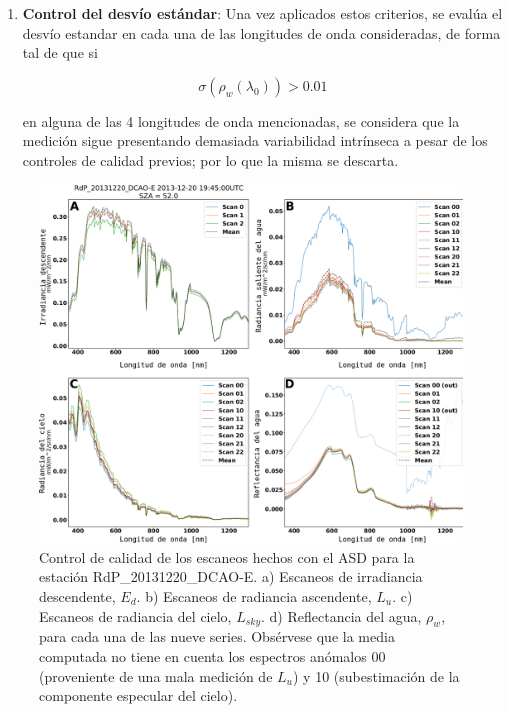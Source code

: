 \begin{enumerate}
                \item \textbf{Control del desvío estándar}: Una vez aplicados estos criterios, se evalúa el desvío estandar en cada una de las longitudes de onda consideradas, de forma tal de que si
                
                \begin{equation}
                    \sigma(\rho_{w}(\lambda_{0})) > 0.01
                    \label{dat:eq:}
                \end{equation}
                
                \noindent
                en alguna de las 4 longitudes de onda mencionadas, se considera que la medición sigue presentando demasiada variabilidad intrínseca a pesar de los controles de calidad previos; por lo que la misma se descarta.

            \end{enumerate}

            \begin{figure}
            \centering
            \includegraphics[width=\textwidth]{dat/figures/ASD_QC.png}
            \caption[Control de calidad de los escaneos hechos con el ASD para la estación RdP\_20131220\_DCAO-E.]{Control de calidad de los escaneos hechos con el ASD para la estación RdP\_20131220\_DCAO-E. a) Escaneos de irradiancia descendente, $E_{d}$. b) Escaneos de radiancia ascendente, $L_{u}$. c) Escaneos de radiancia del cielo, $L_{sky}$. d) Reflectancia del agua, $\rho_{w}$, para cada una de las nueve series. Obsérvese que la media computada no tiene en cuenta los espectros anómalos 00 (proveniente de una mala medición de $L_{u}$) y 10 (subestimación de la componente especular del cielo).} 
            \label{dat:ASD_QC}
            \end{figure}


